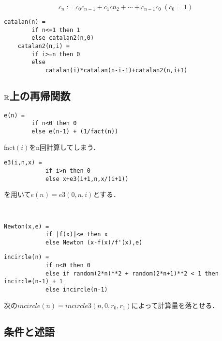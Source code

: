 \documentclass[uplatex, 12pt, dvipdfmx]{jsreport}
\begin{document}
\begin{example}[catalan数]
    \[ c_n:= c_0c_{n-1} + c_1c{n_2} + \cdots + c_{n-1}c_0\;(c_0=1) \]
    \begin{lstlisting}[caption=catalan number]
    catalan(n) = 
        if n<=1 then 1
        else catalan2(n,0)
    catalan2(n,i) = 
        if i>=n then 0
        else
            catalan(i)*catalan(n-i-1)+catalan2(n,i+1)
    \end{lstlisting}
\end{example}

\subsection{$\mathbb{R}$上の再帰関数}

\begin{example}[指数関数]
    \begin{lstlisting}[caption=exponential]
    e(n) = 
        if n<0 then 0
        else e(n-1) + (1/fact(n))
    \end{lstlisting}
    fact$(i)$をn回計算してしまう．
    \begin{lstlisting}[caption=exponential2]
        e3(i,n,x) = 
            if i>n then 0
            else x+e3(i+1,n,x/(i+1))
    \end{lstlisting}
    を用いて$e(n)=e3(0,n,i)$とする．
\end{example}

\begin{example}[Newton法]　

    \begin{lstlisting}[caption=Newton method]
        Newton(x,e) = 
            if |f(x)|<e then x
            else Newton (x-f(x)/f'(x),e)
    \end{lstlisting}
\end{example}

\begin{example}
    
    \begin{lstlisting}[caption=Monte Carlo method]
        incircle(n) =
            if n<0 then 0
            else if random(2*n)**2 + random(2*n+1)**2 < 1 then incircle(n-1) + 1
            else incircle(n-1)
    \end{lstlisting}
    次の$incircle(n)=incircle3(n,0,r_0,r_1)$によって計算量を落とせる．
\end{example}

\subsection{条件と述語}
\end{document}
